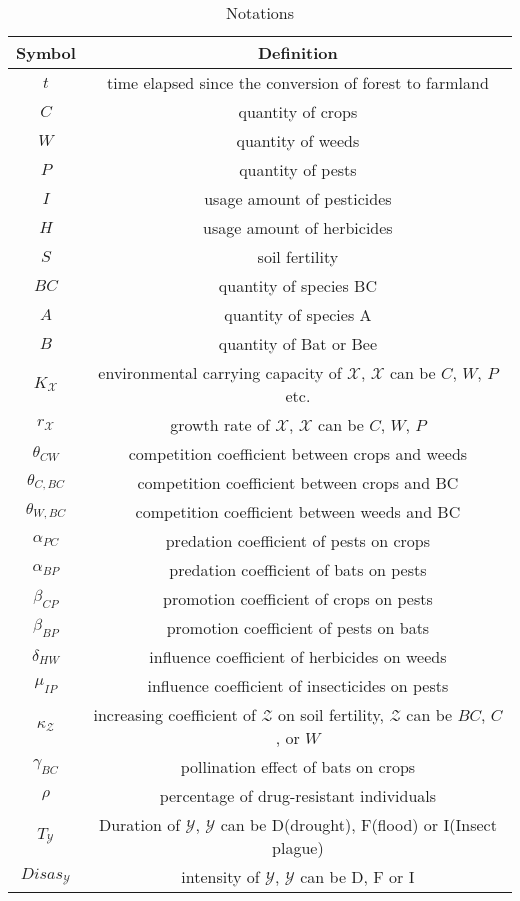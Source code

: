 \documentclass[12pt]{article}  %
\begin{document}
\begin{table}[htbp]
    \begin{center}
    \caption{Notations}
    \renewcommand{\arraystretch}{1.5} %
    \begin{tabular}{cc}
        \toprule
        \multicolumn{1}{m{3cm}}{\centering Symbol}
        &\multicolumn{1}{m{8cm}}{\qquad\quad Definition}\\
        \midrule
        $t$ &  time elapsed since the conversion of forest to farmland \\
        $C$ & quantity of crops \\
        $W$ & quantity of weeds \\
        $P$ & quantity of pests \\
        $I$ &  usage amount of pesticides \\
        $H$ &  usage amount of herbicides \\
        $S$ &  soil fertility \\
        $BC$ & quantity of species BC \\
        $A$ & quantity of species A \\
        $B$ & quantity of Bat or Bee \\
        $K_{\mathcal X}$ &  environmental carrying capacity of $\mathcal{X}$, $\mathcal{X}$ can be $C$, $W$, $P$ etc.\\
        $r_{\mathcal X}$ & growth rate of $\mathcal{X}$, $\mathcal{X}$ can be $C$, $W$, $P$\\
        $\theta_{CW}$ &  competition coefficient between crops and weeds \\
        $\theta_{C,BC}$ &  competition coefficient between crops and BC \\
        $\theta_{W,BC}$ &  competition coefficient between weeds and BC \\
        $\alpha_{PC}$ &  predation coefficient of pests on crops \\
        $\alpha_{BP}$ &  predation coefficient of bats on pests \\
        $\beta_{CP}$ &  promotion coefficient of crops on pests\\
        $\beta_{BP}$ &  promotion coefficient of pests on bats\\
        $\delta_{HW}$ & influence coefficient of herbicides on weeds\\
        $\mu_{IP}$  & influence coefficient of insecticides on pests\\
        $\kappa_{\mathcal Z}$ & increasing coefficient of $\mathcal Z$ on soil fertility, $\mathcal Z$ can be $BC$, $C$, or $W$\\ 
        $\gamma_{BC}$ & pollination effect of bats on crops\\
        $\rho$ &percentage of drug-resistant individuals\\
        $T_{\mathcal Y}$ & Duration of $\mathcal Y$, $\mathcal Y$ can be D(drought), F(flood) or I(Insect plague)\\
        $Disas_{\mathcal Y}$ &intensity of $\mathcal Y$, $\mathcal Y$ can be D, F or I\\


\end{tabular}
\end{center}
\end{table}
\end{document}
